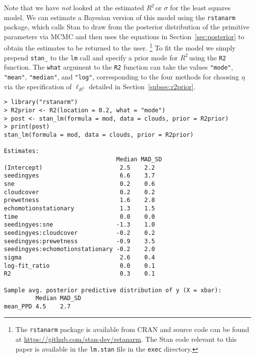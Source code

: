 \documentclass[11pt]{article}
\newcommand{\Rsq}{$R^2\,$}
\newcommand{\locRsq}{\ell_{R^2}}
\begin{document}
Note that we have \emph{not} looked at the estimated \Rsq or $\sigma$ for the
least squares model. We can estimate a Bayesian version of this model using the
{\tt rstanarm} package, which calls Stan \cite{stan} to draw from the posterior
distribution of the primitive parameters via MCMC and then uses the equations in
Section~\ref{sec:posterior} to obtain the estimates to be returned to the user.%
\footnote{The {\tt rstanarm} package is available from CRAN and source code can
be found at \url{https://github.com/stan-dev/rstanarm}. The Stan code relevant
to this paper is available in the {\tt lm.stan} file in the {\tt exec} directory.}
To fit the model we simply prepend {\tt stan\_} to the {\tt lm} call and specify
a prior mode for \Rsq using the {\tt R2} function. The {\tt what} argument to
the {\tt R2} function can take the values {\tt "mode"}, {\tt "mean"},
{\tt "median"}, and {\tt "log"}, corresponding to the four methods for
choosing $\eta$ via the specification of $\locRsq$ detailed in
Section~\ref{subsec:r2prior}.

\vspace{.5cm}
\begin{lstlisting}[frame=lines]
> library("rstanarm")
> R2prior <- R2(location = 0.2, what = "mode")
> post <- stan_lm(formula = mod, data = clouds, prior = R2prior)
> print(post)
stan_lm(formula = mod, data = clouds, prior = R2prior)

Estimates:
                                Median MAD_SD
(Intercept)                      2.5    2.2
seedingyes                       6.6    3.7
sne                              0.2    0.6
cloudcover                       0.2    0.2
prewetness                       1.6    2.8
echomotionstationary             1.3    1.5
time                             0.0    0.0
seedingyes:sne                  -1.3    1.0
seedingyes:cloudcover           -0.2    0.2
seedingyes:prewetness           -0.9    3.5
seedingyes:echomotionstationary -0.2    2.0
sigma                            2.6    0.4
log-fit_ratio                    0.0    0.1
R2                               0.3    0.1

Sample avg. posterior predictive distribution of y (X = xbar):
         Median MAD_SD
mean_PPD 4.5    2.7
\end{lstlisting}
\vspace{.5cm}
\end{document}
